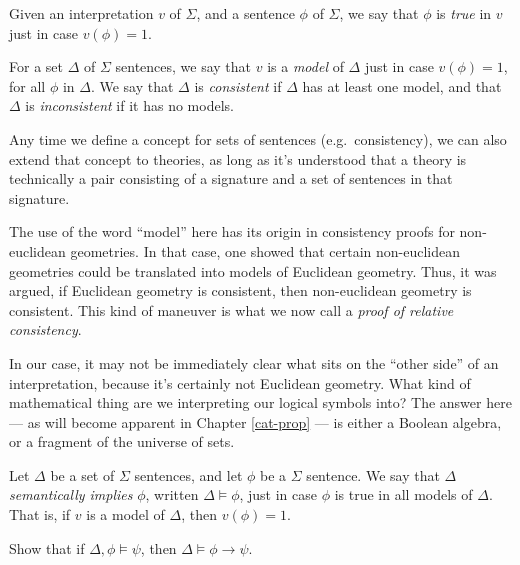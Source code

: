 \begin{defn} Given an interpretation $v$ of $\Sigma$,
  and a sentence $\phi$ of $\Sigma$, we say that $\phi$ is \emph{true}
  in $v$ just in case $v(\phi )=1$.   \end{defn}

\begin{defn} For a set $\Delta$ of $\Sigma$ sentences, we say that $v$
  is a \emph{model} of $\Delta$ just in case $v(\phi )=1$, for all
  $\phi$ in $\Delta$.  We say that $\Delta$ is \emph{consistent} if
  $\Delta$ has at least one model, and that $\Delta$ is
  \emph{inconsistent} if it has no models.  

  Any time we define a concept for sets of sentences (e.g.\
  consistency), we can also extend that concept to theories, as long
  as it's understood that a theory is technically a pair consisting of
  a signature and a set of sentences in that signature.  \end{defn}

\begin{disc} The use of the word ``model'' here has its origin in
  consistency proofs for non-euclidean geometries.  In that case, one
  showed that certain non-euclidean geometries could be translated
  into models of Euclidean geometry.  Thus, it was argued, if
  Euclidean geometry is consistent, then non-euclidean geometry is
  consistent.  This kind of maneuver is what we now call a \emph{proof
    of relative consistency}.

  In our case, it may not be immediately clear what sits on the
  ``other side'' of an interpretation, because it's certainly not
  Euclidean geometry.  What kind of mathematical thing are we
  interpreting our logical symbols into?  The answer here --- as will
  become apparent in Chapter \ref{cat-prop} --- is either a Boolean
  algebra, or a fragment of the universe of sets.  \end{disc}

\begin{defn} Let $\Delta$ be a set of $\Sigma$ sentences, and let
  $\phi$ be a $\Sigma$ sentence.  We say that $\Delta$
  \emph{semantically implies} $\phi$, written $\Delta\vDash \phi$,
  just in case $\phi$ is true in all models of $\Delta$.  That is, if
  $v$ is a model of $\Delta$, then $v(\phi )=1$. \end{defn}

\begin{exercise} Show that if $\Delta,\phi\vDash \psi$, then
  $\Delta\vDash\phi\to\psi$. \end{exercise}

